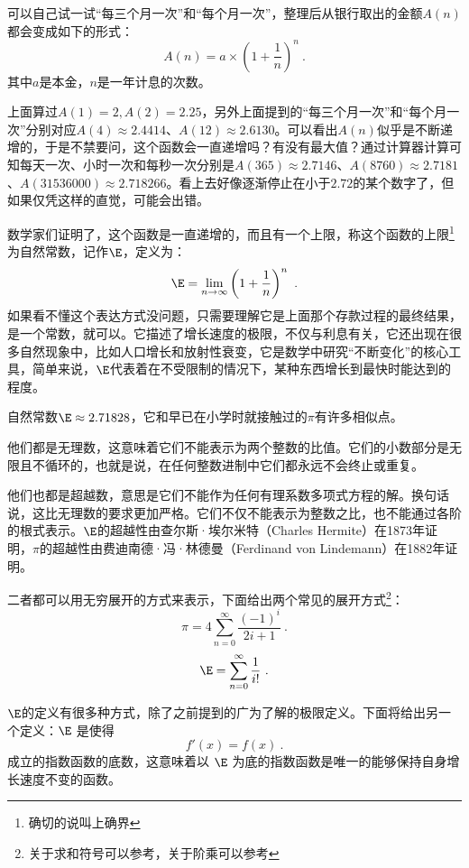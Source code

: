 可以自己试一试“每三个月一次”和“每个月一次”，整理后从银行取出的金额$A(n)$都会变成如下的形式：
\begin{equation}
A(n)=a\times\left(1+\frac{1}{n}\right)^n~.
\end{equation}
其中$a$是本金，$n$是一年计息的次数。

上面算过$A(1)=2,A(2)=2.25$，另外上面提到的“每三个月一次”和“每个月一次”分别对应$A(4)\approx 2.4414$、$A(12)\approx 2.6130$。可以看出$A(n)$似乎是不断递增的，于是不禁要问，这个函数会一直递增吗？有没有最大值？通过计算器计算可知每天一次、小时一次和每秒一次分别是$A(365)\approx 2.7146$、$A(8760)\approx2.7181$、$A(31536000)\approx 2.718266$。看上去好像逐渐停止在小于$2.72$的某个数字了，但如果仅凭这样的直觉，可能会出错。

数学家们证明了，这个函数是一直递增的，而且有一个上限，称这个函数的上限\footnote{确切的说叫上确界}为自然常数，记作$\E$，定义为：
\begin{equation}
\E = \lim_{n \to \infty} \left( 1 + \frac{1}{n} \right)^n~.
\end{equation}
如果看不懂这个表达方式没问题，只需要理解它是上面那个存款过程的最终结果，是一个常数，就可以。它描述了增长速度的极限，不仅与利息有关，它还出现在很多自然现象中，比如人口增长和放射性衰变，它是数学中研究“不断变化”的核心工具，简单来说，$\E$代表着在不受限制的情况下，某种东西增长到最快时能达到的程度。

自然常数$\E \approx 2.71828$，它和早已在小学时就接触过的$\pi$有许多相似点。

他们都是无理数，这意味着它们不能表示为两个整数的比值。它们的小数部分是无限且不循环的，也就是说，在任何整数进制中它们都永远不会终止或重复。

他们也都是超越数，意思是它们不能作为任何有理系数多项式方程的解。换句话说，这比无理数的要求更加严格。它们不仅不能表示为整数之比，也不能通过各阶的根式表示。$\E$的超越性由查尔斯·埃尔米特（Charles Hermite）在1873年证明，$\pi$的超越性由费迪南德·冯·林德曼（Ferdinand von Lindemann）在1882年证明。

二者都可以用无穷展开的方式来表示，下面给出两个常见的展开方式\footnote{关于求和符号可以参考，关于阶乘可以参考}：
\begin{equation}
\pi=4\sum_{n=0}^\infty\frac{(-1)^i}{2i+1}~.
\end{equation}
\begin{equation}
\E=\sum_{n=0}^\infty\frac{1}{i!}~.
\end{equation}

$\E$的定义有很多种方式，除了之前提到的广为了解的极限定义。下面将给出另一个定义：$\E$ 是使得
\begin{equation}
f'(x) = f(x)~.
\end{equation}
成立的指数函数的底数，这意味着以 $\E$ 为底的指数函数是唯一的能够保持自身增长速度不变的函数。

